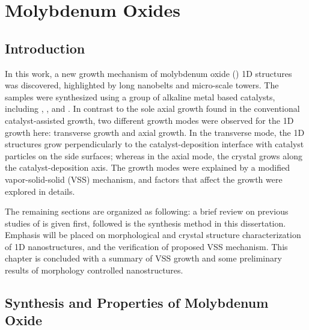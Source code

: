 \chapter{Molybdenum Oxides}

\section{Introduction}

In this work, a new growth mechanism of molybdenum oxide () 1D structures was discovered, highlighted by  long nanobelts and micro-scale towers. The samples were synthesized using a group of alkaline metal based catalysts, including , , and . In contrast to the sole axial growth found in the conventional catalyst-assisted growth, two different growth modes were observed for the  1D growth here: transverse growth and axial growth. In the transverse mode, the 1D structures grow perpendicularly to the catalyst-deposition interface with catalyst particles on the side surfaces; whereas in the axial mode, the crystal grows along the catalyst-deposition axis. The growth modes were explained by a modified vapor-solid-solid (VSS) mechanism, and factors that affect the growth were explored in details. 

The remaining sections are organized as following: a brief review on previous studies of  is given first, followed is the synthesis method in this dissertation. Emphasis will be placed on morphological and crystal structure characterization of 1D  nanostructures, and the verification of proposed VSS mechanism. This chapter is concluded with a summary of VSS growth and some preliminary results of morphology controlled  nanostructures. 

\section{Synthesis and Properties of Molybdenum Oxide}

